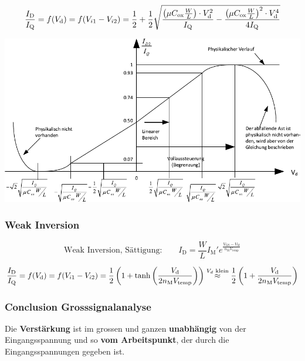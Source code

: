 \[
    \frac{I_\text{D}}{I_\text{Q}} = f(V_{\rm d}) = f(V_{i1} - V_{i2}) = \frac{1}{2} + \frac{1}{2} \sqrt{\frac{\left(\mu C_\text{ox} \frac{W}{L}\right) \cdot V_\text{d}^2}{I_\text{Q}} - \frac{\left(\mu C_\text{ox} \frac{W}{L}\right)^2 \cdot V_\text{d}^4}{4 I_\text{Q}}}
\]


\includegraphics[width=\columnwidth, align=t]{images/09_differenzstufe_grosssignalanalyse_strong_inv.pdf}


\subsubsection{Weak Inversion}

\vspace{-0.2cm}

\[
    \text{Weak Inversion, Sättigung:} \qquad I_\text{D} = \frac{W}{L} I_\text{M}' e^\frac{V_\text{GS}-V_\text{M}}{n_\text{M} V_\text{temp}}
\]

\vspace{-0.2cm}

\[
    \frac{I_\text{D}}{I_\text{Q}} = f(V_{\rm d}) = f(V_{i1} - V_{i2}) = \frac{1}{2} \left(1 + \tanh \left( \frac{V_\text{d}}{2 n_\text{M} V_\text{temp}} \right) \right)
     \overset{V_d \text{ klein}}{\approx} \frac{1}{2} \left(1+\frac{V_\text{d}}{2 n_\text{M} V_\text{temp}}\right)
\]


\subsubsection{Conclusion Grosssignalanalyse}

Die \textbf{Verstärkung} ist im grossen und ganzen \textbf{unabhängig} von der Eingangsspannung und so \textbf{vom Arbeitspunkt}, der durch die Eingangsspannungen gegeben ist.

